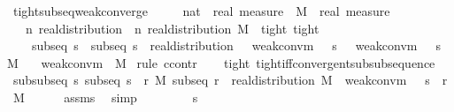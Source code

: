 \documentclass[leqno]{article}
\theoremstyle{definition}
\begin{document}
\begin{isabellebody}
\isamarkupfalse%
\ tight{\isacharunderscore}subseq{\isacharunderscore}weak{\isacharunderscore}converge{\isacharcolon}\isanewline
\ \ \ {\isasymmu}\ {\isacharcolon}{\isacharcolon}\ {\isachardoublequoteopen}nat\ {\isasymRightarrow}\ real\ measure{\isachardoublequoteclose}\ \ M\ {\isacharcolon}{\isacharcolon}\ {\isachardoublequoteopen}real\ measure{\isachardoublequoteclose}\isanewline
\ \ \ {\isachardoublequoteopen}{\isasymAnd}n{\isachardot}\ real{\isacharunderscore}distribution\ {\isacharparenleft}{\isasymmu}\ n{\isacharparenright}{\isachardoublequoteclose}\ {\isachardoublequoteopen}real{\isacharunderscore}distribution\ M{\isachardoublequoteclose}\ \ tight{\isacharcolon}\ {\isachardoublequoteopen}tight\ {\isasymmu}{\isachardoublequoteclose}\ \isanewline
\ \ \ \ subseq{\isacharcolon}\ {\isachardoublequoteopen}{\isasymAnd}s\ {\isasymnu}{\isachardot}\ subseq\ s\ {\isasymLongrightarrow}\ real{\isacharunderscore}distribution\ {\isasymnu}\ {\isasymLongrightarrow}\ weak{\isacharunderscore}conv{\isacharunderscore}m\ {\isacharparenleft}{\isasymmu}\ {\isasymcirc}\ s{\isacharparenright}\ {\isasymnu}\ {\isasymLongrightarrow}\ weak{\isacharunderscore}conv{\isacharunderscore}m\ {\isacharparenleft}{\isasymmu}\ {\isasymcirc}\ s{\isacharparenright}\ M{\isachardoublequoteclose}\isanewline
\ \ \ {\isachardoublequoteopen}weak{\isacharunderscore}conv{\isacharunderscore}m\ {\isasymmu}\ M{\isachardoublequoteclose}\isanewline
{}\isamarkupfalse%
\ {\isacharparenleft}rule\ ccontr{\isacharparenright}\isanewline
\ \ \isamarkupfalse%
\ tight\ tight{\isacharunderscore}iff{\isacharunderscore}convergent{\isacharunderscore}subsubsequence\isanewline
\ \ \isamarkupfalse%
\ subsubseq{\isacharcolon}\ {\isachardoublequoteopen}{\isasymforall}s{\isachardot}\ subseq\ s\ {\isasymlongrightarrow}\ {\isacharparenleft}{\isasymexists}r\ M{\isachardot}\ subseq\ r\ {\isasymand}\ real{\isacharunderscore}distribution\ M\ {\isasymand}\ weak{\isacharunderscore}conv{\isacharunderscore}m\ {\isacharparenleft}{\isasymmu}\ {\isasymcirc}\ s\ {\isasymcirc}\ r{\isacharparenright}\ M{\isacharparenright}{\isachardoublequoteclose}\isanewline
\ \ \ \ \isamarkupfalse%
\ assms\ \isamarkupfalse%
\ simp\isanewline
\ \ \isacommand{{\isacharbraceleft}}\isamarkupfalse%
\isanewline
\ \ \ \ \isamarkupfalse%
\ s\ \isamarkupfalse%

\end{isabellebody}
\end{document}
